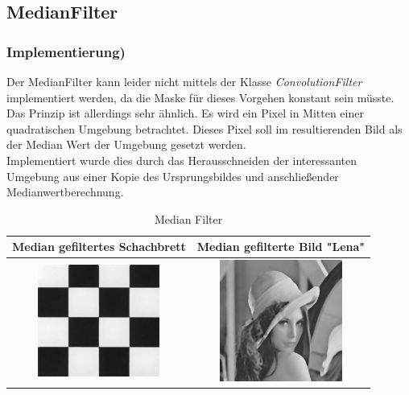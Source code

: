 \documentclass[12pt,german]{article}
\begin{document}
\newpage
\subsection{MedianFilter}
\subsubsection{Implementierung)}

Der MedianFilter kann leider nicht mittels der Klasse \textit{ConvolutionFilter} implementiert werden, da die Maske für dieses Vorgehen konstant sein müsste. Das Prinzip ist allerdings sehr ähnlich. Es wird ein Pixel in Mitten einer quadratischen Umgebung betrachtet. Dieses Pixel soll im resultierenden Bild als der Median Wert der Umgebung gesetzt werden. \\
Implementiert wurde dies durch das Herausschneiden der interessanten Umgebung aus einer Kopie des Ursprungsbildes und anschließender Medianwertberechnung. 



\begin{table}[H]
  \centering
  \begin{tabular}{| c | c |}
    \hline
 	 Median gefiltertes Schachbrett & Median gefilterte Bild "Lena" \\
    \hline
	\includegraphics[width=4cm]{../testData/Median/SchachbrettR4.jpg} & 	\includegraphics[width=4cm]{../testData/Median/LenaMedian.jpg} \\
	\hline
  \end{tabular}
  \caption{Median Filter}
  \label{tab:MedianFilter}
\end{table}
\end{document}
